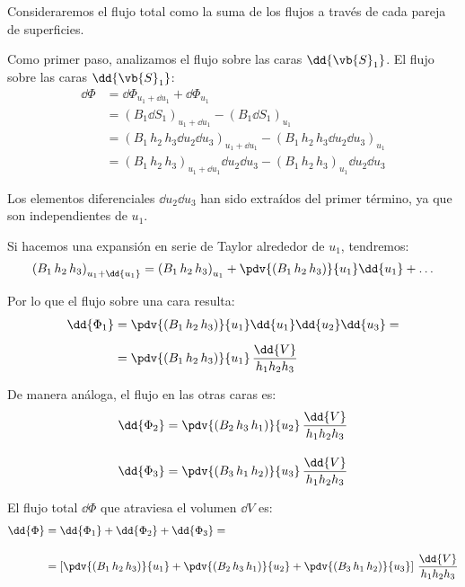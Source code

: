 Consideraremos el flujo total como la suma de los flujos a través de cada pareja de superficies.
\par
Como primer paso, analizamos el flujo sobre las caras $\dd{\vb{S}_{1}}$. El flujo sobre las caras $\dd{\vb{S}_{1}}$:
\begin{align*}
\dd{\Phi} &= \dd{\Phi_{u_{1} + \dd{u_{1}}}} + \dd{\Phi_{u_{1}}} \\[0.5em] 
&= \left( B_{1} \dd{S_{1}} \right)_{u_{1} + \dd{u_{1}}} - \left( B_{1} \dd{S_{1}} \right)_{u_{1}} \\[0.5em] 
&= \left( B_{1} \, h_{2} \, h_{3} \dd{u_{2}} \dd{u_{3}} \right)_{u_{1} + \dd{u_{1}}} - \left( B_{1} \, h_{2} \, h_{3} \dd{u_{2}} \dd{u_{3}} \right)_{u_{1}} \\[0.5em] 
&= \left( B_{1} \, h_{2} \, h_{3} \right)_{u_{1} + \dd{u_{1}}} \dd{u_{2}} \dd{u_{3}} - \left( B_{1} \, h_{2} \, h_{3} \right)_{u_{1}} \dd{u_{2}} \dd{u_{3}}
\end{align*}
 
Los elementos diferenciales $\dd{u_{2}} \dd{u_{3}}$ han sido extraídos del primer término, ya que son independientes de $u_{1}$.
\par
Si hacemos una expansión en serie de Taylor alrededor de $u_{1}$, tendremos:
\begin{align*}
\left( B_{1} \, h_{2} \, h_{3} \right)_{u_{1} + \dd{u_{1}}} = \left( B_{1} \, h_{2} \, h_{3} \right)_{u_{1}} + \pdv{\left( B_{1} \, h_{2} \, h_{3} \right)}{u_{1}} \dd{u_{1}} + \ldots
\end{align*}

Por lo que el flujo sobre una cara resulta:
\begin{align*}
\dd{\Phi_{1}} &= \pdv{\left( B_{1} \, h_{2} \, h_{3} \right)}{u_{1}} \dd{u_{1}} \dd{u_{2}} \dd{u_{3}} = \\[0.5em] 
&= \pdv{\left( B_{1} \, h_{2} \, h_{3} \right)}{u_{1}} \, \dfrac{\dd{V}}{h_{1} h_{2} h_{3}}
\end{align*}

De manera análoga, el flujo en las otras caras es:
\begin{align*}
\dd{\Phi_{2}} &= \pdv{\left( B_{2} \, h_{3} \, h_{1} \right)}{u_{2}} \, \dfrac{\dd{V}}{h_{1} h_{2} h_{3}} \\[1em]
\dd{\Phi_{3}} &= \pdv{\left( B_{3} \, h_{1} \, h_{2} \right)}{u_{3}} \, \dfrac{\dd{V}}{h_{1} h_{2} h_{3}}
\end{align*}

El flujo total $\dd{\Phi}$ que atraviesa el volumen $\dd{V}$ es:
\begin{align*}
\dd{\Phi} &= \dd{\Phi_{1}} + \dd{\Phi_{2}} + \dd{\Phi_{3}} = \\[1em]
&= \left[ \pdv{\left( B_{1} \, h_{2} \, h_{3} \right)}{u_{1}} + \pdv{\left( B_{2} \, h_{3} \, h_{1} \right)}{u_{2}} + \pdv{\left( B_{3} \, h_{1} \, h_{2} \right)}{u_{3}} \right] \, \dfrac{\dd{V}}{h_{1} h_{2} h_{3}}
\end{align*}

